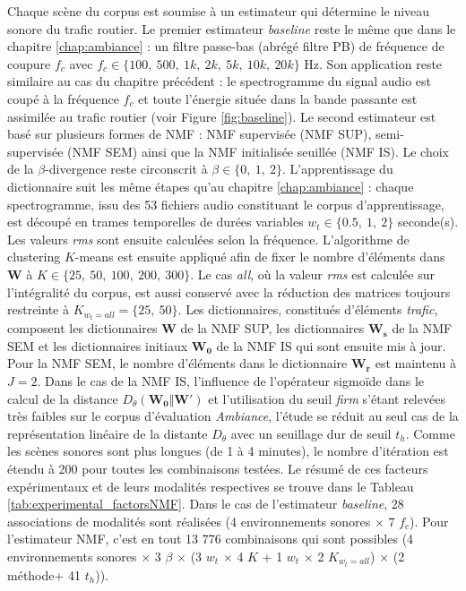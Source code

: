 Chaque scène du corpus est soumise à un estimateur qui détermine le niveau sonore du trafic routier. 
Le premier estimateur \textit{baseline} reste le même que dans le chapitre \ref{chap:ambiance} : un filtre passe-bas (abrégé filtre PB) de fréquence de coupure $f_c$ avec $f_c \in \lbrace 100,~500,~1k,~2k,~5k,~10k,~20k \rbrace$ Hz. Son application reste similaire au cas du chapitre précédent : le spectrogramme du signal audio est coupé à la fréquence $f_c$ et toute l'énergie située dans la bande passante est assimilée au trafic routier (voir Figure \ref{fig:baseline}).
Le second estimateur est basé sur plusieurs formes de NMF : NMF supervisée (NMF SUP), semi-supervisée (NMF SEM) ainsi que la NMF initialisée seuillée (NMF IS). Le choix de la $\beta$-divergence reste circonscrit à $\beta \in \lbrace 0,~1,~2 \rbrace$.
L'apprentissage du dictionnaire suit les même étapes qu'au chapitre \ref{chap:ambiance} : chaque spectrogramme, issu des 53 fichiers audio constituant le corpus d'apprentissage, est découpé en trames temporelles de durées variables $w_t \in \lbrace 0.5,~1,~2 \rbrace$ seconde(s). Les valeurs \textit{rms} sont ensuite calculées selon la fréquence. L'algorithme de clustering $K$-means est ensuite appliqué afin de fixer le nombre d'éléments dans $\mathbf{W}$ à $K \in \lbrace 25,~50,~100,~200,~ 300 \rbrace$. Le cas \textit{all}, où la valeur \textit{rms} est calculée sur l'intégralité du corpus, est aussi conservé avec la réduction des matrices toujours restreinte à $K_{w_t = all} = \lbrace 25,~50 \rbrace$. Les dictionnaires, constitués d'éléments \textit{trafic}, composent les dictionnaires $\mathbf{W}$ de la NMF SUP, les dictionnaires $\mathbf{W_s}$ de la NMF SEM et les dictionnaires initiaux $\mathbf{W_0}$ de la NMF IS qui sont ensuite mis à jour.
Pour la NMF SEM, le nombre d'éléments dans le dictionnaire $\mathbf{W_r}$ est maintenu à $J = 2$.
Dans le cas de la NMF IS, l'influence de l'opérateur sigmoïde dans le calcul de la distance $D_{\theta}(\mathbf{W_0}\Vert \mathbf{W'})$ et l'utilisation du seuil \textit{firm} s'étant relevées très faibles sur le corpus d'évaluation \textit{Ambiance}, l'étude se réduit au seul cas de la représentation linéaire de la distante $D_{\theta}$ avec un seuillage dur de seuil $t_h$.
Comme les scènes sonores sont plus longues (de 1 à 4 minutes), le nombre d'itération est étendu à 200 pour toutes les combinaisons testées. 
Le résumé de ces facteurs expérimentaux et de leurs modalités respectives se trouve dans le Tableau \ref{tab:experimental_factorsNMF}. Dans le cas de l'estimateur \textit{baseline}, 28 associations de modalités sont réalisées (4 environnements sonores $\times$ 7 $f_c$). Pour l'estimateur NMF, c'est en tout 13 776 combinaisons qui sont possibles (4 environnements sonores $\times$ 3 $\beta$ $\times$ (3 $w_t$ $\times$ 4 $K$ + 1 $w_t$ $\times$ 2 $K_{w_t = all}$) $\times$ (2 méthode+ 41 $t_h$)).

